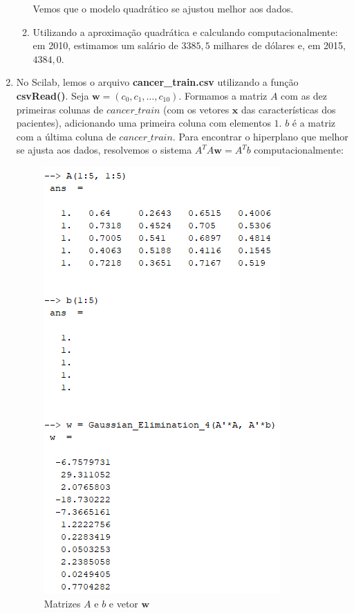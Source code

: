 \documentclass[11pt]{article}
\begin{document}
\begin{enumerate}
\begin{enumerate}
    Vemos que o modelo quadrático se ajustou melhor aos dados.
    \bigbreak
    \item Utilizando a aproximação quadrática e calculando computacionalmente: em 2010, estimamos um salário de $3385,5$ milhares de dólares e, em 2015, $4384,0$.
\end{enumerate}

\item No Scilab, lemos o arquivo \textbf{cancer\_train.csv} utilizando a função \textbf{csvRead()}. Seja $\mathbf{w} = (c_0, c_1, \ldots, c_{10})$. Formamos a matriz $A$ com as dez primeiras colunas de $cancer\_train$ (com os vetores $\mathbf{x}$ das características dos pacientes), adicionando uma primeira coluna com elementos $1$. $b$ é a matriz com a última coluna de $cancer\_train$. Para encontrar o hiperplano que melhor se ajusta aos dados, resolvemos o sistema $A^TA\mathbf{w}=A^Tb$ computacionalmente:

\begin{figure}[H]
    \centering
    \includegraphics[]{5-1}
    \caption{Matrizes $A$ e $b$ e vetor $\mathbf{w}$}
\end{figure}


\end{enumerate}
\end{document}
